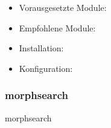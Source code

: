 \begin{itemize}[parsep=0pt, itemsep=5.0pt plus 2.0pt minus 1.0pt, leftmargin=*]
	\item Vorausgesetzte Module:

	\item Empfohlene Module:

	\item Installation: \standardinstall

	\item Konfiguration:

\end{itemize}



\newpage
\subsubsection{morphsearch}\label{subsub:morphsearch}
morphsearch
